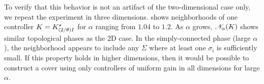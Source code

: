 To verify that this behavior %
is not an artifact of the two-dimensional case only,
we repeat the experiment in three dimensions.
 shows neighborhoods
of one controller $K = K^\star_{(2/\theta) I}$
for $\alpha$ ranging from $1.04$ to $1.2$.
As $\alpha$ grows, $\mathscr{N}_{\alpha}(K)$ shows similar topological phases as the $2$D case.
In the simply-connected phase (large $\alpha$),
the neighborhood appears to include
any $\Sigma$ where at least one $\sigma_i$ is sufficiently small.
If this property holds in higher dimensions,
then it would be possible
to construct a cover using only controllers of uniform gain in all dimensions
for large $\alpha$.

